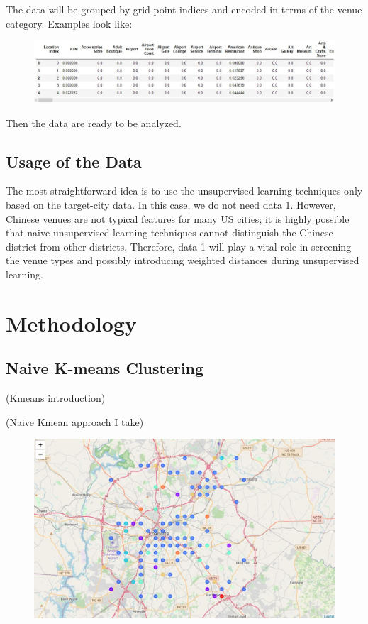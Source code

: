 \documentclass{article}
\begin{document}
\newpage

The data will be grouped by grid point indices and encoded in terms of the venue category. Examples look like:
\begin{figure}[h!]
\includegraphics[width=1.0\textwidth]{c6.jpg}
\centering
\end{figure}

Then the data are ready to be analyzed.

\subsection{Usage of the Data}

The most straightforward idea is to use the unsupervised learning techniques only based on the target-city data.
In this case, we do not need data 1.
However, Chinese venues are not typical features for many US cities; it is highly possible that naive unsupervised learning techniques cannot distinguish the Chinese district from other districts.
Therefore, data 1 will play a vital role in screening the venue types and possibly introducing weighted distances during unsupervised learning.

\newpage

\section{Methodology}
\subsection{Naive K-means Clustering}

(Kmeans introduction)

(Naive Kmean approach I take)

\begin{figure}[h!]
\includegraphics[width=1.0\textwidth]{cn1.jpg}
\centering
\end{figure}
\end{document}
